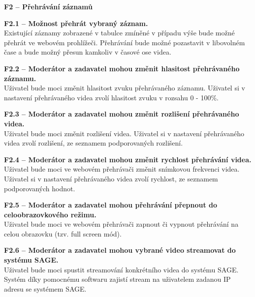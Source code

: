 \documentclass[thesis=M,czech]{FITthesis}[2012/06/26]
\begin{document}
\begin{description}
  \item \textbf{F2 -- Přehrávání záznamů}
  \begin{description}
    \item \textbf{F2.1 -- Možnost přehrát vybraný záznam.\\}
    Existující záznamy zobrazené v tabulce zmíněné v případu výše bude možné přehrát ve webovém prohlížeči. Přehrávání bude možné pozastavit v libovolném čase a bude možný přesun kamkoliv v časové ose videa.
    \item \textbf{F2.2 -- Moderátor a zadavatel mohou změnit hlasitost přehrávaného záznamu.\\}
	Uživatel bude moci změnit hlasitost zvuku přehrávaného záznamu. Uživatel si v nastavení přehrávaného videa zvolí hlasitost zvuku v rozsahu 0 - 100\%.
    \item \textbf{F2.3 -- Moderátor a zadavatel mohou změnit rozlišení přehrávaného videa.\\}
    Uživatel bude moci změnit rozlišení videa. Uživatel si v nastavení přehrávaného videa zvolí rozlišení, ze seznamem podporovaných rozlišení.
    \item \textbf{F2.4 -- Moderátor a zadavatel mohou změnit rychlost přehrávání videa.\\}
    Uživatel bude moci ve webovém přehrávači změnit snímkovou frekvenci videa. Uživatel si v nastavení přehrávaného videa zvolí rychlost, ze seznamem podporovaných hodnot.
    \item \textbf{F2.5 -- Moderátor a zadavatel mohou přehrávání přepnout do celoobrazovkového režimu.\\}
    Uživatel bude moci ve webovém přehrávači zapnout či vypnout přehrávání na celou obrazovku (tzv. full screen mód).
    \item \textbf{F2.6 -- Moderátor a zadavatel mohou vybrané video streamovat do systému SAGE.\\}
	Uživatel bude moci spustit streamování konkrétního videa do systému SAGE. Systém díky pomocnému softwaru zajistí stream na uživatelem zadanou IP adresu se systémem SAGE.
  \end{description}


\end{description}
\end{document}
